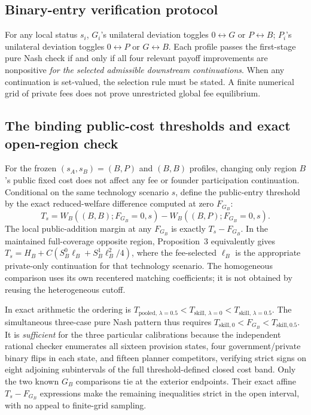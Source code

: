 \documentclass[11pt]{article}
\begin{document}
\subsection{Binary-entry verification protocol}
For any local status $s_i$, $G_i$'s unilateral deviation toggles $0\leftrightarrow G$ or $P\leftrightarrow B$; $P_i$'s unilateral deviation toggles $0\leftrightarrow P$ or $G\leftrightarrow B$. Each profile passes the first-stage pure Nash check if and only if all four relevant payoff improvements are nonpositive \emph{for the selected admissible downstream continuations}. When any continuation is set-valued, the selection rule must be stated. A finite numerical grid of private fees does not prove unrestricted global fee equilibrium.

\subsection{The binding public-cost thresholds and exact open-region check}
For the frozen $(s_A,s_B)=(B,P)$ and $(B,B)$ profiles, changing only region $B$'s public fixed cost does not affect any fee or founder participation continuation. Conditional on the same technology scenario $s$, define the public-entry threshold by the exact reduced-welfare difference computed at zero $F_{G_B}$:
\begin{equation}
 T_s=W_B((B,B);F_{G_B}=0,s)-W_B((B,P);F_{G_B}=0,s).
 \label{eq:exact-public-threshold}
\end{equation}
The local public-addition margin at any $F_{G_B}$ is exactly $T_s-F_{G_B}$. In the maintained full-coverage opposite region, Proposition~3 equivalently gives
$T_s=H_B+C(S_B^0\ell_B+S_B^1\ell_B^2/4)$,
where the fee-selected $\ell_B$ is the appropriate private-only continuation for that technology scenario. The homogeneous comparison uses its own recentered matching coefficients; it is not obtained by reusing the heterogeneous cutoff.

In exact arithmetic the ordering is $T_{\mathrm{pooled},\,\lambda=0.5}<T_{\mathrm{skill},\,\lambda=0}<T_{\mathrm{skill},\,\lambda=0.5}$. The simultaneous three-case pure Nash pattern thus requires $T_{\mathrm{skill},0}<F_{G_B}<T_{\mathrm{skill},0.5}$. It is \emph{sufficient} for the three particular calibrations because the independent rational checker enumerates all sixteen provision states, four government/private binary flips in each state, and fifteen planner competitors, verifying strict signs on eight adjoining subintervals of the full threshold-defined closed cost band. Only the two known $G_B$ comparisons tie at the exterior endpoints. Their exact affine $T_s-F_{G_B}$ expressions make the remaining inequalities strict in the open interval, with no appeal to finite-grid sampling.
\end{document}
